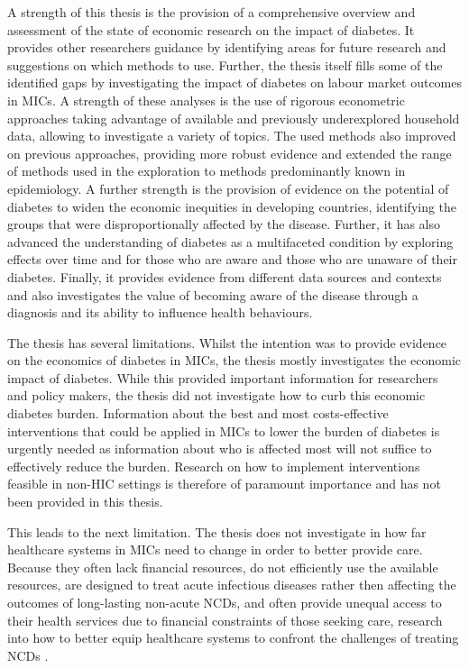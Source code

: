 A strength of this thesis is the provision of a comprehensive overview and assessment of the state of economic research on the impact of diabetes. It provides other researchers guidance by identifying areas for future research and suggestions on which methods to use. Further, the thesis itself fills some of the identified gaps by investigating the impact of diabetes on labour market outcomes in \acp{MIC}. A strength of these analyses is the use of rigorous econometric approaches taking advantage of available and previously underexplored household data, allowing to investigate a variety of topics. The used methods also improved on previous approaches, providing more robust evidence and extended the range of methods used in the exploration to methods predominantly known in epidemiology.  A further strength is the provision of evidence on the potential of diabetes to widen the economic inequities in developing countries, identifying the groups that were disproportionally affected by the disease. Further, it has also advanced the understanding of diabetes as a multifaceted condition by exploring effects over time and for those who are aware and those who are unaware of their diabetes. Finally, it provides evidence from different data sources and contexts and also investigates the value of becoming aware of the disease through a diagnosis and its ability to influence health behaviours.

The thesis has several limitations. Whilst the intention was to provide evidence on the economics of diabetes in \acp{MIC}, the thesis mostly investigates the economic impact of diabetes. While this provided important information for researchers and policy makers, the thesis did not investigate how to curb this economic diabetes burden. Information about the best and most costs-effective interventions that could be applied in \acp{MIC} to lower the burden of diabetes is urgently needed as information about who is affected most will not suffice to effectively reduce the burden. Research on how to implement interventions feasible in non-\ac{HIC} settings is therefore of paramount importance and has not been provided in this thesis.

This leads to the next limitation. The thesis does not investigate in how far healthcare systems in \acp{MIC} need to change in order to better provide care. Because they often lack financial resources, do not efficiently use the available resources, are designed to treat acute infectious diseases rather then affecting the outcomes of long-lasting non-acute \acp{NCD}, and often provide unequal access to their health services due to financial constraints of those seeking care, research into how to better equip healthcare systems to confront the challenges of treating \acp{NCD} \parencite{Mills2014,Guzman2010}.

